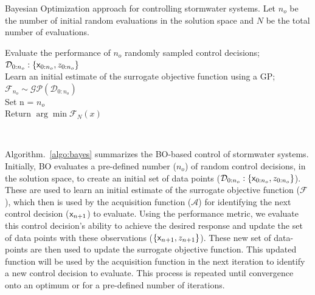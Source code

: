 \begin{algorithm}
\caption{Bayesian Optimization approach for controlling stormwater systems. Let $n_o$ be the number of initial random eval\-uations in the solution space and $N$ be the total number of evaluations.}\label{algo:bayes}
Evaluate the performance of $n_o$ randomly sampled control decisions;  $\mathcal{D}_{0:n_o}:\{{\mathsf{x}}_{0:n_o}, z_{0:n_o}\}$\\
Learn an initial estimate of the surrogate objective function using a GP\@; $\mathcal{F}_{n_o} \sim \mathcal{GP}(\mathcal{D}_{0:n_o})$\\
Set n = $n_o$\\
Return $\arg\min \mathcal{F}_N(x)$
\end{algorithm}

\

Algorithm.~\ref{algo:bayes} summarizes the BO-based control of stormwater systems.
Initially, BO evaluates a pre-defined number ($n_o$) of random control decisions, in the solution space, to create an initial set of data points ($\mathcal{D}_{0:n_o}:\{ {\mathsf{x}}_{0:n_o}, z_{0:n_o} \}$). 
These are used to learn an initial estimate of the surrogate objective function ($\mathcal{F}$), which then is used by the acquisition function ($\mathcal{A}$) for identifying the next control decision (${\mathsf{x}}_{n+1}$) to evaluate.
Using the performance metric, we evaluate this control decision's ability to achieve the desired response and update the set of data points with these observations ($\{ {\mathsf{x}}_{n+1}, z_{n+1}\}$).
These new set of data-points are then used to update the surrogate objective function.
This updated function will be used by the acquisition function in the next iteration to identify a new control decision to evaluate.
This process is repeated until convergence onto an optimum or for a pre-defined number of iterations.

\

